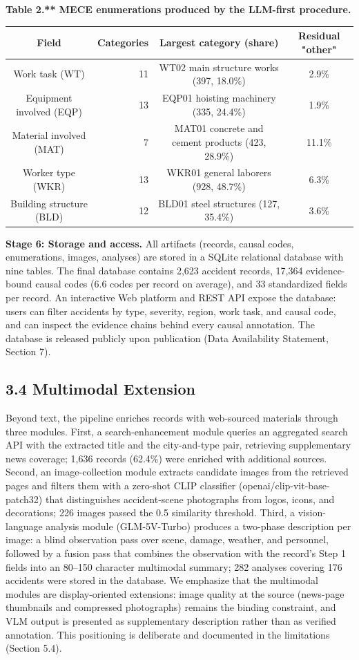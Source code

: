 \documentclass[11pt]{article}
\begin{document}
\textbf{Table 2.** MECE enumerations produced by the LLM-first procedure.}
\begin{table}[htbp]
\centering
\small
\begin{tabular}{crcc}
\hline
Field & Categories & Largest category (share) & Residual "other" \\
\hline
Work task (WT) & 11 & WT02 main structure works (397, 18.0\%) & 2.9\% \\
Equipment involved (EQP) & 13 & EQP01 hoisting machinery (335, 24.4\%) & 1.9\% \\
Material involved (MAT) & 7 & MAT01 concrete and cement products (423, 28.9\%) & 11.1\% \\
Worker type (WKR) & 13 & WKR01 general laborers (928, 48.7\%) & 6.3\% \\
Building structure (BLD) & 12 & BLD01 steel structures (127, 35.4\%) & 3.6\% \\
\hline
\end{tabular}
\end{table}
\textbf{Stage 6: Storage and access.} All artifacts (records, causal codes, enumerations, images, analyses) are stored in a SQLite relational database with nine tables. The final database contains 2,623 accident records, 17,364 evidence-bound causal codes (6.6 codes per record on average), and 33 standardized fields per record. An interactive Web platform and REST API expose the database: users can filter accidents by type, severity, region, work task, and causal code, and can inspect the evidence chains behind every causal annotation. The database is released publicly upon publication (Data Availability Statement, Section 7).

\subsection{3.4 Multimodal Extension}
Beyond text, the pipeline enriches records with web-sourced materials through three modules. First, a search-enhancement module queries an aggregated search API with the extracted title and the city-and-type pair, retrieving supplementary news coverage; 1,636 records (62.4\%) were enriched with additional sources. Second, an image-collection module extracts candidate images from the retrieved pages and filters them with a zero-shot CLIP classifier (openai/clip-vit-base-patch32) that distinguishes accident-scene photographs from logos, icons, and decorations; 226 images passed the 0.5 similarity threshold. Third, a vision-language analysis module (GLM-5V-Turbo) produces a two-phase description per image: a blind observation pass over scene, damage, weather, and personnel, followed by a fusion pass that combines the observation with the record's Step 1 fields into an 80--150 character multimodal summary; 282 analyses covering 176 accidents were stored in the database. We emphasize that the multimodal modules are display-oriented extensions: image quality at the source (news-page thumbnails and compressed photographs) remains the binding constraint, and VLM output is presented as supplementary description rather than as verified annotation. This positioning is deliberate and documented in the limitations (Section 5.4).
\end{document}
